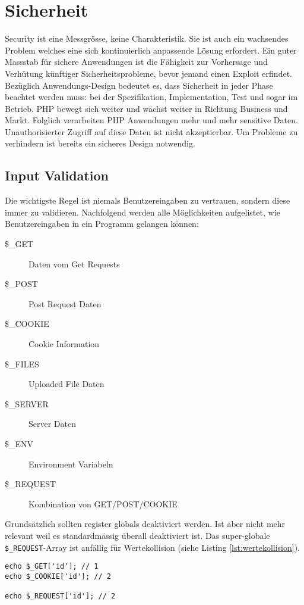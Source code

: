 \section{Sicherheit}

Security ist eine Messgrösse, keine Charakteristik. Sie ist auch ein wachsendes Problem welches eine sich kontinuierlich anpassende Lösung erfordert. Ein guter Massstab für sichere Anwendungen ist die Fähigkeit zur Vorhersage und Verhütung künftiger Sicherheitsprobleme, bevor jemand einen Exploit erfindet. Bezüglich Anwendungs-Design bedeutet es, dass Sicherheit in jeder Phase beachtet werden muss: bei der Spezifikation, Implementation, Test und sogar im Betrieb. PHP bewegt sich weiter und wächst weiter in Richtung Business und Markt. Folglich verarbeiten PHP Anwendungen mehr und mehr sensitive Daten. Unauthorisierter Zugriff auf diese Daten ist nicht akzeptierbar. Um Probleme zu verhindern ist bereits ein sicheres Design notwendig.

\subsection{Input Validation}

Die wichtigste Regel ist niemals Benutzereingaben zu vertrauen, sondern diese immer zu validieren. Nachfolgend werden alle Möglichkeiten aufgelistet, wie Benutzereingaben in ein Programm gelangen können:
\begin{description}
	\item[\$\_GET] Daten vom Get Requests
	\item[\$\_POST] Post Request Daten
	\item[\$\_COOKIE] Cookie Information
	\item[\$\_FILES] Uploaded File Daten
	\item[\$\_SERVER] Server Daten
	\item[\$\_ENV] Environment Variabeln
	\item[\$\_REQUEST] Kombination von GET/POST/COOKIE
\end{description}
Grundsätzlich sollten register globals deaktiviert werden. Ist aber nicht mehr relevant weil es standardmässig überall deaktiviert ist. Das super-globale \verb|$_REQUEST|-Array ist anfällig für Wertekollision (siehe Listing \ref{lst:wertekollision}).

\begin{lstlisting}[caption=\$\_REQUEST Wertekollison, label=lst:wertekollision]
echo $_GET['id']; // 1
echo $_COOKIE['id']; // 2

echo $_REQUEST['id']; // 2
\end{lstlisting}

